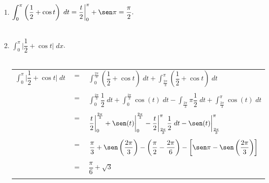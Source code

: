 \begin{enumerate}[\bfseries 1.]
\item $\displaystyle\int_0^\pi \left(\dfrac{1}{2}+\cos t\right) \; dt = \dfrac{t}{2}\bigg|_0^\pi+ \sen \pi = \dfrac{\pi}{2}.$\\\\

\item $\displaystyle\int_0^\pi  \bigg|\dfrac{1}{2} + \cos t\bigg|\; dx$.\\\\
    \begin{center}
	\begin{tabular}{rcl}
	    $\displaystyle\int_{0}^{\pi} \bigg| \dfrac{1}{2}+\cos t\bigg| \; dt$&$=$&$\displaystyle\int_0^{\frac{2\pi}{3}}\left(\dfrac{1}{2} + \cos t\right)\; dt + \int_{\frac{2\pi}{3}}^{\pi}\left(\dfrac{1}{2} + \cos t\right)\; dt$\\\\
										&$=$&$\displaystyle\int_0^{\frac{2\pi}{3}} \dfrac{1}{2}\; dt + \int_{0}^{\frac{2\pi}{3}} \cos(t) \; dt - \int_{\frac{2\pi}{3}}\pi \dfrac{1}{2}\; dt + \int_{\frac{2\pi}{3}}^\pi \cos(t) \; dt$\\\\
										&$=$&$\dfrac{t}{2}\bigg|_0^{\frac{2\pi}{3}} + \sen(t)\bigg|_{0}^{\frac{2\pi}{3}} -  \dfrac{t}{2} \bigg|_{\frac{2\pi}{3}}^\pi \dfrac{1}{2}\; dt - \sen(t)\bigg|_{\frac{2\pi}{3}}^\pi$\\\\
										&$=$&$\dfrac{\pi}{3}+\sen\left(\dfrac{2\pi}{3}\right) - \left(\dfrac{\pi}{2}-\dfrac{2\pi}{6}\right)-\left[\sen \pi - \sen\left( \dfrac{2\pi}{3}\right)\right]$\\\\
										&$=$&$\dfrac{\pi}{6}+\sqrt{3}$\\\\
	\end{tabular}
    \end{center}


\end{enumerate}
